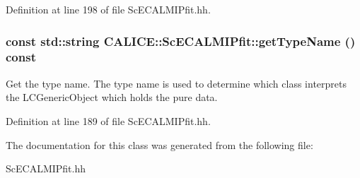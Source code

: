 Definition at line 198 of file ScECALMIPfit.hh.
\subsubsection[{getTypeName}]{\setlength{\rightskip}{0pt plus 5cm}const std::string CALICE::ScECALMIPfit::getTypeName () const\hspace{0.3cm}{\ttfamily  [inline]}}\label{classCALICE_1_1ScECALMIPfit_a981a323b301f58badb342432b3550d1d}


Get the type name. The type name is used to determine which class interprets the LCGenericObject which holds the pure data. 

Definition at line 189 of file ScECALMIPfit.hh.

The documentation for this class was generated from the following file:\begin{DoxyCompactItemize}
\item 
ScECALMIPfit.hh\end{DoxyCompactItemize}
